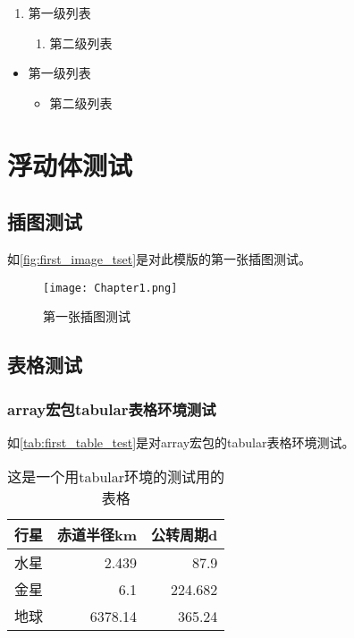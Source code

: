 \begin{enumerate}
	\item 第一级列表\label{itm:11}
	\begin{enumerate}
		\item 第二级列表\label{itm:12}
	\end{enumerate}
\end{enumerate}

\begin{itemize}
	\item 第一级列表
	\begin{itemize}
		\item 第二级列表
	\end{itemize}
\end{itemize}

\section{浮动体测试}
\subsection{插图测试}
如\autoref{fig:first_image_tset}是对此模版的第一张插图测试。

\begin{figure}[htbp]
	\centering
	\texttt{[image: Chapter1.png]}
	\caption{第一张插图测试}\label{fig:first_image_tset}
\end{figure}

\subsection{表格测试}

\subsubsection{array宏包tabular表格环境测试}
如\autoref{tab:first_table_test}是对array宏包的tabular表格环境测试。
\begin{table}[htbp]
	\centering
	\caption{这是一个用tabular环境的测试用的表格}\label{tab:first_table_test}
    \begin{tabular}{lrr}
    \toprule
    \textbf{行星}     & \textbf{赤道半径}km & \textbf{公转周期}d \\
    \midrule
    水星     & 2.439  & 87.9 \\
    金星     & 6.1    & 224.682 \\
    地球     & 6378.14 & 365.24 \\
    \bottomrule
    \end{tabular}%
\end{table}

